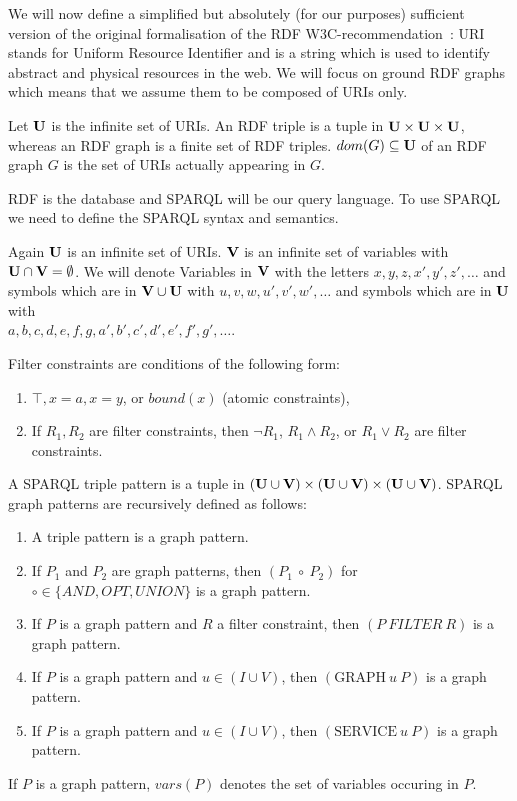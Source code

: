 We will now define a simplified but absolutely (for our purposes) sufficient version of the
original formalisation of the RDF W3C-recommendation~\cite{rdf}:
URI stands for Uniform Resource Identifier and is a string which is used to identify
abstract and physical resources in the web.
We will focus on ground RDF graphs which means that we assume them to be composed of URIs only.

\begin{definition}[RDF]
	Let $\mathbf{U}$ is the infinite set of URIs. An RDF triple is a tuple in $\mathbf{U} \times \mathbf{U} \times \mathbf{U}$, whereas an
	RDF graph is a finite set of RDF triples. $dom(G) \subseteq \mathbf{U}$ of an RDF graph $G$ is the set of URIs actually appearing in $G$.
\end{definition}

RDF is the database and SPARQL will be our query language. To use SPARQL we need
to define the SPARQL syntax and semantics.

\begin{definition}
	Again $\mathbf{U}$ is an infinite set of URIs. 
	$\mathbf{V}$ is an infinite set of variables with $\mathbf{U} \cap \mathbf{V} = \emptyset$. 
	We will denote Variables in $\mathbf{V}$ with the letters $x,y,z,x',y',z',\dots$ and
	symbols which are in $\mathbf{V} \cup \mathbf{U}$ with $u,v,w,u',v',w',\dots$ and
	symbols which are in $\mathbf{U}$ with\\ $a,b,c,d,e,f,g,a',b',c',d',e',f',g',\dots$.
	
	Filter constraints are conditions of the following form:
	\begin{enumerate}
		\item $\top, x=a, x=y$, or $bound(x)$ (atomic constraints),
		\item If $R_1, R_2$ are filter constraints, then $\neg R_1$, $R_1 \land R_2$,
			or $R_1 \lor R_2$ are filter constraints.
	\end{enumerate}

	A SPARQL triple pattern is a tuple in  $(\mathbf{U} \cup \mathbf{V}) \times (\mathbf{U} \cup \mathbf{V}) \times (\mathbf{U} \cup \mathbf{V})$. 
	SPARQL graph patterns are recursively defined as follows:
	\begin{enumerate}
		\item A triple pattern is a graph pattern.
		\item If $P_1$ and $P_2$ are graph patterns, then $(P_1  \ \circ \ P_2)$ for
			$\circ \in \{ AND, OPT, UNION\}$ is a graph pattern.
		\item If $P$ is a graph pattern and $R$ a filter constraint, then $(P \ FILTER \ R)$ is a graph pattern.
		\item If $P$ is a graph pattern and $u \in (I \cup V)$, then $(\mbox{GRAPH} \  u \ P)$ is a graph pattern.
		\item If $P$ is a graph pattern and $u \in (I \cup V)$, then $(\mbox{SERVICE} \  u \ P)$ is a graph pattern.
	\end{enumerate}
If $P$ is a graph pattern, $vars(P)$ denotes the set of variables occuring in $P$.
\end{definition}

